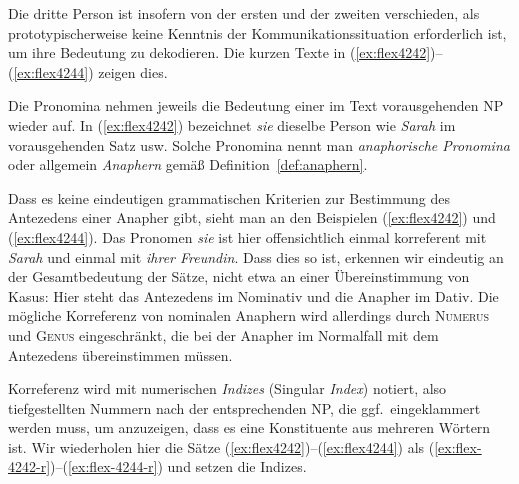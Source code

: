 Die dritte Person ist insofern von der ersten und der zweiten verschieden, als prototypischerweise keine Kenntnis der Kommunikationssituation erforderlich ist, um ihre Bedeutung zu dekodieren.
Die kurzen Texte in (\ref{ex:flex4242})--(\ref{ex:flex4244}) zeigen dies.

\begin{exe}
\end{exe}


Die Pronomina nehmen jeweils die Bedeutung einer im Text vorausgehenden NP wieder auf.
In (\ref{ex:flex4242}) bezeichnet \textit{sie} dieselbe Person wie \textit{Sarah} im vorausgehenden Satz usw.
Solche Pronomina nennt man \textit{anaphorische Pronomina} oder allgemein \textit{Anaphern} gemäß Definition~\ref{def:anaphern}.


Dass es keine eindeutigen grammatischen Kriterien zur Bestimmung des Antezedens einer Anapher gibt, sieht man an den Beispielen (\ref{ex:flex4242}) und (\ref{ex:flex4244}).
Das Pronomen \textit{sie} ist hier offensichtlich einmal korreferent mit \textit{Sarah} und einmal mit \textit{ihrer Freundin}.
Dass dies so ist, erkennen wir eindeutig an der Gesamtbedeutung der Sätze, nicht etwa an einer Übereinstimmung von Kasus:
Hier steht das Antezedens im Nominativ und die Anapher im Dativ.
Die mögliche Korreferenz von nominalen Anaphern wird allerdings durch \textsc{Numerus} und \textsc{Genus} eingeschränkt, die bei der Anapher im Normalfall mit dem Antezedens übereinstimmen müssen.

Korreferenz wird mit numerischen \textit{Indizes} (Singular \textit{Index}) notiert, also tiefgestellten Nummern nach der entsprechenden NP, die ggf.\ eingeklammert werden muss, um anzuzeigen, dass es eine Konstituente aus mehreren Wörtern ist.
Wir wiederholen hier die Sätze (\ref{ex:flex4242})--(\ref{ex:flex4244}) als (\ref{ex:flex-4242-r})--(\ref{ex:flex-4244-r}) und setzen die Indizes.

